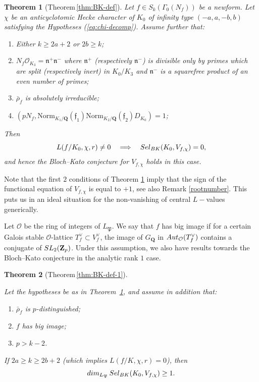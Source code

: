 \documentclass[10pt,letterpaper]{amsart}
\theoremstyle{plain}
\newtheorem{thm}{Theorem}[subsection] %
\theoremstyle{definition}
\theoremstyle{definition}
\theoremstyle{plain}
\theoremstyle{plain}
\theoremstyle{plain}
\theoremstyle{remark}
\numberwithin{equation}{section}
\newcommand{\fkn}{\mathfrak{n}}
\def\cO{\mathcal O}
\newcommand{\Q}{\mathbf{Q}}
\newcommand{\Z}{\mathbf{Z}}
\begin{document}
{\begin{thm}[Theorem\,\ref{thm:BK-def}] %
\label{thmB}
Let $f\in S_k(\Gamma_0(N_f))$ be a newform. Let $\chi$ be an anticyclotomic Hecke character of $K_0$ of infinity type $(-a,a,-b,b)$ satisfying the Hypotheses (\ref{eq:chi-decomp}). Assume further that:
\begin{enumerate}
    \item Either $k\ge 2a+2$ or $2b\ge k$; 
    \item $N_f\cO_{K_3}=\mathfrak{n}^+\mathfrak{n}^-$ where $\fkn^+$
(respectively $\fkn^-$) is divisible only by primes which are split (respectively inert) in $K_0/K_3$ and $\fkn^-$ is a squarefree product of an even number of primes;
    \item $\bar{\rho}_f$ is absolutely irreducible; 
    \item $(pN_f,\mathrm{Norm}_{K_1/\Q}(\mathfrak{f}_1)\mathrm{Norm}_{K_2/\Q}(\mathfrak{f}_2)D_{K_0})=1$;
\end{enumerate}
Then
\[
L(f/K_0,\chi,r)\neq 0\quad\Longrightarrow\quad{\rm Sel}_{\rm BK}(K_0,V_{f,\chi})=0,
\] 
and hence the Bloch--Kato conjecture for $V_{f,\chi}$ holds in this case.
\end{thm}

Note that the first $2$ conditions of Theorem \ref{thmB} imply that the sign of the functional equation of $V_{f,\chi}$ is equal to $+1$, see also Remark \ref{rootnumber}. This puts us in an ideal situation for the non-vanishing of central $L-$values generically. 

Let $\cO$ be the ring of integers of $L_\mathfrak{P}$. We say that $f$ has {big image} if for a certain Galois stable $\cO$-lattice $T_f^\vee\subset V_f^\vee$, the image of $G_\Q$ in ${\rm Aut}_\cO(T_f^\vee)$ contains a conjugate of ${\rm SL}_2(\Z_p)$. Under this assumption, we also have results towards the Bloch--Kato conjecture in the analytic rank $1$ case.
\begin{thm}[Theorem\,\ref{thm:BK-def-1}] 
\label{thmC}

Let the hypotheses be as in Theorem~\ref{thmB},  and assume in addition that: 
\begin{enumerate}
    \item $\bar{\rho}_f$ is $p$-distinguished;
    \item $f$ has big image;
    \item $p>k-2$.
\end{enumerate}
If $2a\geq k\ge 2b+2$ (which implies $L(f/K,\chi,r)=0$), then 
\[
{\rm dim}_{L_\mathfrak{P}}\,{\rm Sel}_{\rm BK}(K_0,V_{f,\chi})\geq 1.
\]


\end{thm}}
\end{document}
